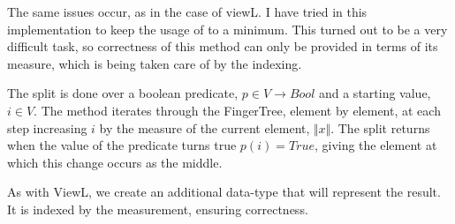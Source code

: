 \documentclass[12pt,twoside,notitlepage]{report}
\begin{document}
The same issues occur, as in the case of viewL. I have tried in this implementation to keep the usage of  to a minimum. This turned out to be a very difficult task, so correctness of this method can only be provided in terms of its measure, which is being taken care of by the indexing.

The split is done over a boolean predicate, $p \in V \to Bool$ and a starting value, $i \in V$. The method iterates through the FingerTree, element by element, at each step increasing $i$ by the measure of the current element, $\Vert x \Vert$. The split returns when the value of the predicate turns true $p(i) = True$, giving the element at which this change occurs as the middle.


As with ViewL, we create an additional data-type that will represent the result. It is indexed by the measurement, ensuring correctness.

\begin{code}
\\
\>  \AgdaSymbol{\{}\AgdaSymbol{\}} \AgdaSymbol{(} \AgdaSymbol{:}  \AgdaSymbol{)} \AgdaSymbol{(} \AgdaSymbol{:}  \AgdaSymbol{)}\<%
\\
\>[2]\<[12]%
\>[12]  \AgdaSymbol{:}   \<%
\\
\>[2]\<[12]%
\>[12]  \AgdaSymbol{:}     \AgdaSymbol{:}\<%
\\
\>[2]\<[12]%
\>[12]\AgdaSymbol{\{} \AgdaSymbol{:} \AgdaSymbol{\}}    \<%
\\
\>[0]\<[2]%
\>[2] \AgdaSymbol{:}  \AgdaSymbol{\{} \AgdaSymbol{:} \AgdaSymbol{\}} \AgdaSymbol{\{} \AgdaSymbol{:} \AgdaSymbol{\}}\<%
\\
\>[2]\<[10]%
\>[10] \AgdaSymbol{(}   \AgdaSymbol{\{}\AgdaSymbol{\})} \<[35]%
\>[35]\<%
\\
\>[2]\<[10]%
\>[10] \AgdaSymbol{(} \AgdaSymbol{:} \AgdaSymbol{)} \<[35]%
\>[35]\<%
\\
\>[2]\<[10]%
\>[10] \AgdaSymbol{(}   \AgdaSymbol{\{}\AgdaSymbol{\})} \<[35]%
\>[35]\<%
\\
\>[2]\<[10]%
\>[10]    \AgdaSymbol{\{}      \AgdaSymbol{\}}\<%
\\
\end{code}
\end{document}
